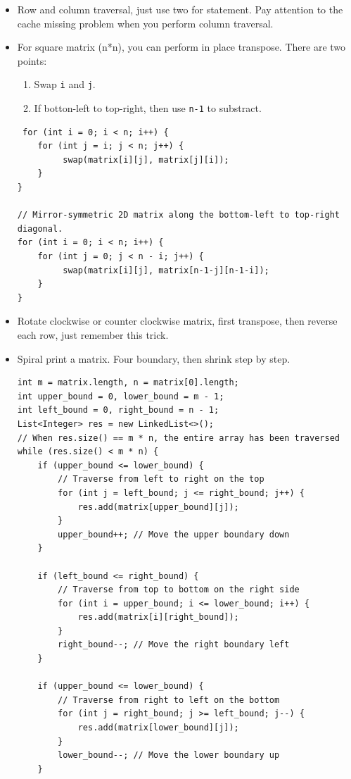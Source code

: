 \documentclass[a4paper,11pt,twoside]{book}
\begin{document}
\begin{itemize}
	
	\item Row and column traversal, just use two for statement. Pay attention to the cache missing problem when you perform column traversal. 
	
	\item For square matrix (n*n), you can perform in place transpose. There are two points:
\begin{enumerate}
	\item Swap \texttt{i} and \texttt{j}. 
	\item If botton-left to top-right, then use \texttt{n-1} to substract.
\end{enumerate}
\begin{lstlisting}
 for (int i = 0; i < n; i++) {
	for (int j = i; j < n; j++) {
		 swap(matrix[i][j], matrix[j][i]);
	}
}

// Mirror-symmetric 2D matrix along the bottom-left to top-right diagonal.
for (int i = 0; i < n; i++) {
	for (int j = 0; j < n - i; j++) {
		 swap(matrix[i][j], matrix[n-1-j][n-1-i]);
	}
}
\end{lstlisting}

	\item Rotate clockwise or counter clockwise matrix, first transpose, then reverse each row, just remember this trick. 
	
	\item Spiral print a matrix. Four boundary, then shrink step by step. 
\begin{lstlisting}
int m = matrix.length, n = matrix[0].length;
int upper_bound = 0, lower_bound = m - 1;
int left_bound = 0, right_bound = n - 1;
List<Integer> res = new LinkedList<>();
// When res.size() == m * n, the entire array has been traversed
while (res.size() < m * n) {
	if (upper_bound <= lower_bound) {
		// Traverse from left to right on the top
		for (int j = left_bound; j <= right_bound; j++) {
			res.add(matrix[upper_bound][j]);
		}
		upper_bound++; // Move the upper boundary down
	}
	
	if (left_bound <= right_bound) {
		// Traverse from top to bottom on the right side
		for (int i = upper_bound; i <= lower_bound; i++) {
			res.add(matrix[i][right_bound]);
		}
		right_bound--; // Move the right boundary left
	}
	
	if (upper_bound <= lower_bound) {
		// Traverse from right to left on the bottom
		for (int j = right_bound; j >= left_bound; j--) {
			res.add(matrix[lower_bound][j]);
		}
		lower_bound--; // Move the lower boundary up
	}
	

\end{lstlisting}
\end{itemize}
\end{document}
